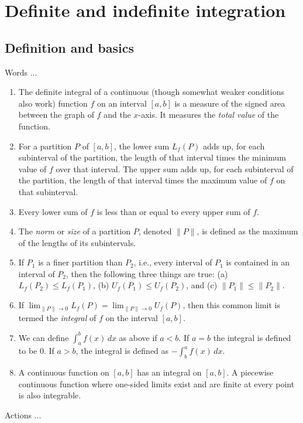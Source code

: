 \documentclass[10pt]{amsart}
\begin{document}
\section{Definite and indefinite integration}

\subsection{Definition and basics}

Words ...

\begin{enumerate}
\item The definite integral of a continuous (though somewhat weaker
  conditions also work) function $f$ on an interval $[a,b]$ is a measure
  of the signed area between the graph of $f$ and the $x$-axis. It
  measures the {\em total value} of the function.
\item For a partition $P$ of $[a,b]$, the lower sum $L_f(P)$ adds up,
  for each subinterval of the partition, the length of that interval
  times the minimum value of $f$ over that interval. The upper sum
  adds up, for each subinterval of the partition, the length of that
  interval times the maximum value of $f$ on that subinterval.
\item Every lower sum of $f$ is less than or equal to every upper sum
  of $f$.
\item The {\em norm} or {\em size} of a partition $P$, denoted $\| P
  \|$, is defined as the maximum of the lengths of its
  subintervals.
\item If $P_1$ is a finer partition than $P_2$, i.e., every interval
  of $P_1$ is contained in an interval of $P_2$, then the following
  three things are true: (a) $L_f(P_2) \le L_f(P_1)$, (b) $U_f(P_1)
  \le U_f(P_2)$, and (c) $\| P_1 \| \le \| P_2 \|$.
\item If $\lim_{\| P \| \to 0} L_f(P) = \lim_{\| P \| \to 0} U_f(P)$,
  then this common limit is termed the {\em integral} of $f$ on the
  interval $[a,b]$.
\item We can define $\int_a^b f(x) \, dx$ as above if $a < b$. If $a =
  b$ the integral is defined to be $0$. If $a > b$, the integral is
  defined as $-\int_b^a f(x) \, dx$.
\item A continuous function on $[a,b]$ has an integral on $[a,b]$. A
  piecewise continuous function where one-sided limits exist and are
  finite at every point is also integrable.
\end{enumerate}

Actions ...
\end{document}
